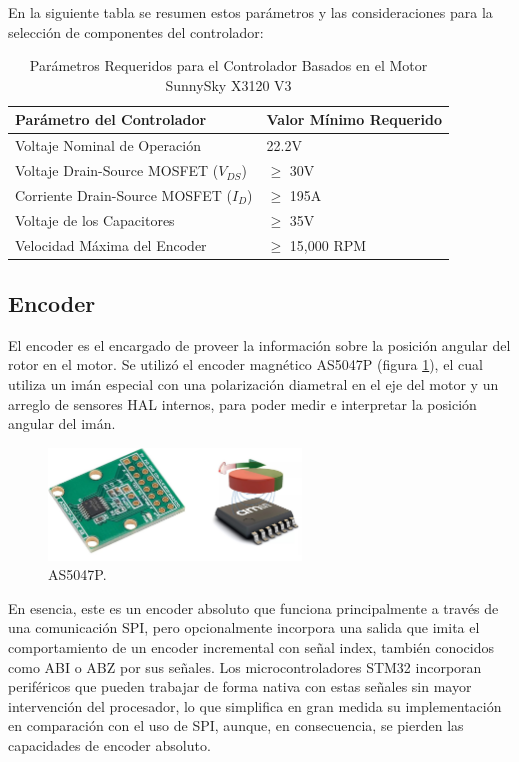 \documentclass[11pt]{report}
\begin{document}
En la siguiente tabla se resumen estos parámetros y las consideraciones para la selección de componentes del controlador:

\begin{table}[h!]
	\centering
	\caption{Parámetros Requeridos para el Controlador Basados en el Motor SunnySky X3120 V3}
	\begin{tabular}{l l}
		\hline
		\textbf{Parámetro del Controlador}         & \textbf{Valor Mínimo Requerido}           \\
		\hline
		Voltaje Nominal de Operación         & 22.2V                 \\
		Voltaje Drain-Source MOSFET (\(V_{DS}\)) & $\geq$ 30V                   \\
		Corriente Drain-Source MOSFET (\(I_D\))          & $\geq$ 195A             \\
		Voltaje de los Capacitores          & $\geq$ 35V             \\
		Velocidad Máxima del Encoder          & $\geq$ 15,000 RPM             \\
		\hline
	\end{tabular}
	\label{tabla_parametros_controlador}
\end{table}
\FloatBarrier

\newpage
\subsection{Encoder}

El encoder es el encargado de proveer la información sobre la posición angular del rotor en el motor. Se utilizó el encoder magnético AS5047P (figura \ref{AS5047P}), el cual utiliza un imán especial con una polarización diametral en el eje del motor y un arreglo de sensores HAL internos, para poder medir e interpretar la posición angular del imán.

\begin{figure}[ht]
	\centering
	\includegraphics[width=0.6\textwidth]{imagenes/Motor/AS5047P.jpg}
	\caption{AS5047P.}
	\label{AS5047P}
\end{figure}
\FloatBarrier

En esencia, este es un encoder absoluto que funciona principalmente a través de una comunicación SPI, pero opcionalmente incorpora una salida que imita el comportamiento de un encoder incremental con señal index, también conocidos como ABI o ABZ por sus señales. Los microcontroladores STM32 incorporan periféricos que pueden trabajar de forma nativa con estas señales sin mayor intervención del procesador, lo que simplifica en gran medida su implementación en comparación con el uso de SPI, aunque, en consecuencia, se pierden las capacidades de encoder absoluto.
\end{document}

